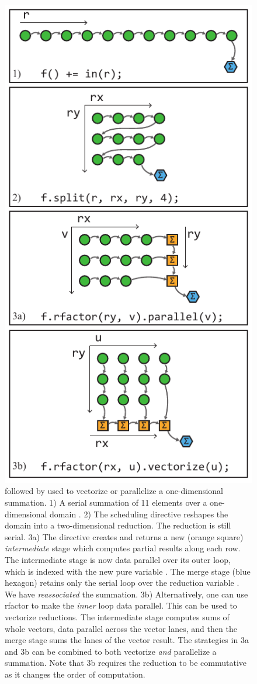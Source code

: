 \begin{figure}
\centering
\includegraphics[width=0.9\columnwidth]{rfactor}
\caption{%
 followed by  used to vectorize or parallelize a one-dimensional summation. 1) A serial summation of 11 elements over a one-dimensional domain . 2) The  scheduling directive reshapes the domain into a two-dimensional reduction. The reduction is still serial. 3a) The  directive creates and returns a new (orange square) \emph{intermediate} stage which computes partial results along each row. The intermediate stage is now data parallel over its outer loop, which is indexed with the new pure variable . The merge stage (blue hexagon) retains only the serial loop over the reduction variable . We have \emph{reassociated} the summation. 3b) Alternatively, one can use rfactor to make the \emph{inner} loop data parallel. This can be used to vectorize reductions. The intermediate stage computes sums of whole vectors, data parallel across the vector lanes, and then the merge stage sums the lanes of the vector result. The strategies in 3a and 3b can be combined to both vectorize \emph{and} parallelize a summation. Note that 3b requires the reduction to be commutative as it changes the order of computation.
}
\end{figure}
